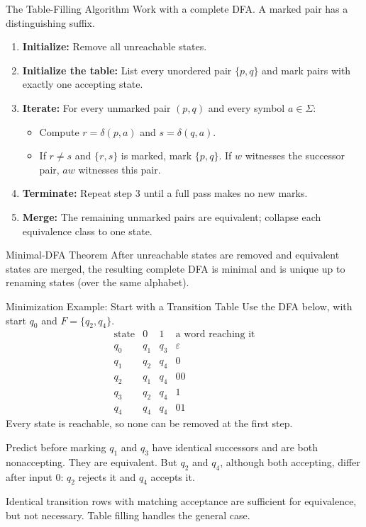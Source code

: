 \documentclass[10pt]{beamer}
\begin{document}
\begin{frame}{The Table-Filling Algorithm}
  \small
  Work with a complete DFA. A marked pair has a distinguishing suffix.
  
  \begin{enumerate}
      \item \textbf{Initialize:} Remove all unreachable states.
      \pause
      \item \textbf{Initialize the table:} List every unordered pair
        $\{p,q\}$ and mark pairs with exactly one accepting state.
      \pause
      \item \textbf{Iterate:} For every unmarked pair $(p, q)$ and every symbol $a \in \Sigma$:
      \begin{itemize}
          \item Compute $r = \delta(p, a)$ and $s = \delta(q, a)$.
          \item If $r\ne s$ and $\{r,s\}$ is marked, mark $\{p,q\}$.
            If $w$ witnesses the successor pair, $aw$ witnesses this pair.
      \end{itemize}
      \pause
      \item \textbf{Terminate:} Repeat step 3 until a full pass makes no new marks.
      \item \textbf{Merge:} The remaining unmarked pairs are equivalent;
        collapse each equivalence class to one state.
  \end{enumerate}
  \begin{exampleblock}{Minimal-DFA Theorem}
    After unreachable states are removed and equivalent states are merged, the
    resulting complete DFA is minimal and is unique up to renaming states
    (over the same alphabet).
  \end{exampleblock}
\end{frame}

\begin{frame}{Minimization Example: Start with a Transition Table}
  \small
  Use the DFA below, with start $q_0$ and $F=\{q_2,q_4\}$.
  \[
    \begin{array}{c|cc|c}
      \text{state} & 0 & 1 & \text{a word reaching it}\\
      \hline
      q_0 & q_1 & q_3 & \varepsilon\\
      q_1 & q_2 & q_4 & 0\\
      q_2 & q_1 & q_4 & 00\\
      q_3 & q_2 & q_4 & 1\\
      q_4 & q_4 & q_4 & 01
    \end{array}
  \]
  Every state is reachable, so none can be removed at the first step.
  \pause
  \begin{block}{Predict before marking}
    $q_1$ and $q_3$ have identical successors and are both nonaccepting.
    They are equivalent. But $q_2$ and $q_4$, although both accepting,
    differ after input $0$: $q_2$ rejects it and $q_4$ accepts it.
  \end{block}
  Identical transition rows with matching acceptance are sufficient for
  equivalence, but not necessary. Table filling handles the general case.
\end{frame}
\end{document}
